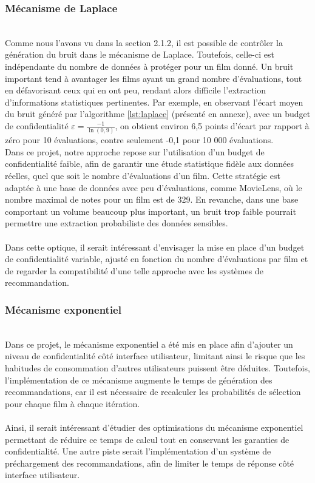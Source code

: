 \documentclass{article}
\begin{document}
    \subsubsection{Mécanisme de Laplace}
    $ $\\
    Comme nous l’avons vu dans la section 2.1.2, il est possible de contrôler la génération du bruit dans le mécanisme de Laplace. 
    Toutefois, celle-ci est indépendante du nombre de données à protéger pour un film donné. Un bruit important tend à avantager les 
    films ayant un grand nombre d’évaluations, tout en défavorisant ceux qui en ont peu, rendant alors difficile l’extraction d’informations 
    statistiques pertinentes. Par exemple, en observant l’écart moyen du bruit généré par l’algorithme \ref{lst:laplace} (présenté en annexe), 
    avec un budget de confidentialité $\varepsilon = \frac{-1}{\ln(0{,}9)}$, on obtient environ 6,5 points d’écart par rapport à zéro pour 10 
    évaluations, contre seulement -0,1 pour 10 000 évaluations.\\
    Dans ce projet, notre approche repose sur l’utilisation d’un budget de confidentialité faible, afin de garantir une étude statistique 
    fidèle aux données réelles, quel que soit le nombre d’évaluations d’un film. Cette stratégie est adaptée à une base de données avec 
    peu d’évaluations, comme MovieLens, où le nombre maximal de notes pour un film est de 329. En revanche, dans une base comportant un volume 
    beaucoup plus important, un bruit trop faible pourrait permettre une extraction probabiliste des données sensibles.\\
    \\
    Dans cette optique, il serait intéressant d’envisager la mise en place d’un budget de confidentialité variable, ajusté en fonction du nombre d’évaluations 
    par film et de regarder la compatibilité d'une telle approche avec les systèmes de recommandation.
    \subsubsection{Mécanisme exponentiel}
    $ $\\
    Dans ce projet, le mécanisme exponentiel a été mis en place afin d’ajouter un niveau de confidentialité côté interface utilisateur, limitant 
    ainsi le risque que les habitudes de consommation d'autres utilisateurs puissent être déduites. Toutefois, l’implémentation de ce mécanisme 
    augmente le temps de génération des recommandations, car il est nécessaire de recalculer les probabilités de sélection pour chaque film à chaque itération.\\
    \\
    Ainsi, il serait intéressant d’étudier des optimisations du mécanisme exponentiel permettant de réduire ce temps de calcul tout en conservant les garanties 
    de confidentialité. Une autre piste serait l’implémentation d’un système de préchargement des recommandations, afin de limiter le temps de réponse côté interface utilisateur.
   
\end{document}
